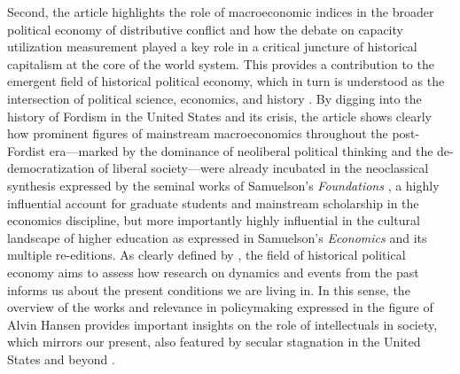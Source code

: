 \documentclass[11pt]{article}
\begin{document}
Second, the article highlights the role of macroeconomic indices in the broader political economy of distributive conflict and how the debate on capacity utilization measurement played a key role in a critical juncture of historical capitalism at the core of the world system. This provides a contribution to the emergent field of historical political economy, which in turn is understood as the intersection of political science, economics, and history \citep{jenkinsrubin2024hpe}. By digging into the history of Fordism in the United States and its crisis, the article shows clearly how prominent figures of mainstream macroeconomics throughout the post-Fordist era---marked by the dominance of neoliberal political thinking and the de-democratization of liberal society---were already incubated in the neoclassical synthesis expressed by the seminal works of Samuelson's \emph{Foundations} \citep{samuelson1947}, a highly influential account for graduate students and mainstream scholarship in the economics discipline, but more importantly highly influential in the cultural landscape of higher education as expressed in Samuelson's \emph{Economics} \citep{samuelson1948} and its multiple re-editions. As clearly defined by \citet{jenkinsrubin2024hpe}, the field of historical political economy aims to assess how research on dynamics and events from the past informs us about the present conditions we are living in. In this sense, the overview of the works and relevance in policymaking expressed in the figure of Alvin Hansen provides important insights on the role of intellectuals in society, which mirrors our present, also featured by secular stagnation in the United States and beyond \citep{cruztavani2023}.
\end{document}

